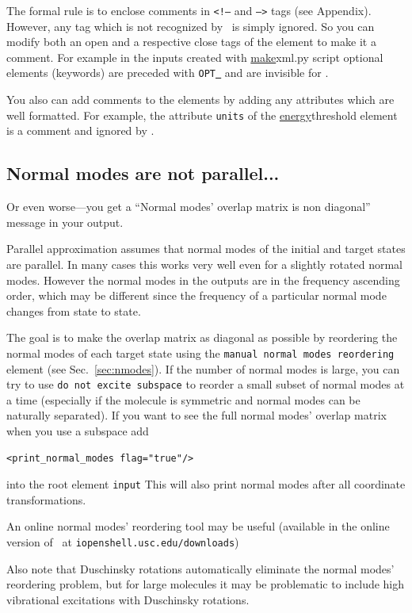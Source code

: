 \documentclass[11pt]{article}
\begin{document}
The formal rule is to enclose comments in {\tt <!--} and {\tt -->} tags (see Appendix).
However, any tag which is not recognized by \ezFCF\ is simply ignored.
So you can modify both an open and a respective close tags of the element to make it a comment.
For example in the inputs created with \ul{make}{xml.py} script optional elements (keywords)
are preceded with {\tt OPT\underline{~}} and are invisible for \ezFCF.

You also can add comments to the elements by adding any attributes which are well formatted. 
For example, the attribute {\tt units} of the \ul{energy}{threshold} element is
a comment and ignored by \ezFCF.


\subsection{Normal modes are not parallel...}
\label{sec:nonparallel}
Or even worse---you get a ``Normal modes' overlap matrix is non diagonal'' message in your output.

Parallel approximation assumes that normal modes of the initial and target states are parallel.
In many cases this works very well even for a slightly rotated normal modes. 
However the normal modes in the \ai outputs are in the frequency ascending order,
which may be different since the frequency of a particular normal mode changes from state to state. 

The goal is to make the overlap matrix as diagonal as possible by reordering
the normal modes of each target state using the {\tt manual normal modes reordering} element
(see Sec.~\ref{sec:nmodes}). 
If the number of normal modes is large, you can try to use {\tt do not excite subspace}
to reorder a small subset of normal modes at a time
(especially if the molecule is symmetric and normal modes can be naturally separated).
If you want to see the full normal modes' overlap matrix when you use a subspace add
\begin{lstlisting}[frame=single,framerule=0pt]
<print_normal_modes flag="true"/>
\end{lstlisting}
into the root element {\tt input}
This will also print normal modes after all coordinate transformations.

An online normal modes' reordering tool may be useful (available in the online version of \ezFCF\
at {\tt iopenshell.usc.edu/downloads})

Also note that Duschinsky rotations automatically eliminate the normal modes' reordering problem, but for
large molecules it may be problematic to include high vibrational excitations with Duschinsky rotations.
\end{document}
